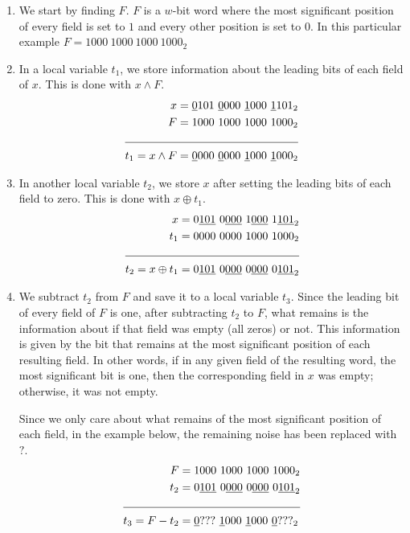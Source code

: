 \begin{enumerate}
    \item \label{blt:msb1}
    We start by finding $F$. $F$ is a $w$-bit word where the most significant position of every field is set to $1$ and every other position is set to $0$. In this particular example $F = 1000\ 1000\ 1000\ 1000_2$
    
    \item \label{blt:msb2}
    In a local variable $t_1$, we store information about the leading bits of each field of $x$. This is done with $x \wedge F$.
    \begin{align*}
                       x &= \underline{0}101\ \underline{0}000\ \underline{1}000\ \underline{1}101_2 \\
                       F &= 1000\ 1000\ 1000\ 1000_2 \\ \cline{1-2} 
        t_1 = x \wedge F &= \underline{0}000\ \underline{0}000\ \underline{1}000\ \underline{1}000_2
    \end{align*}
    
    \item \label{blt:msb3}
    In another local variable $t_2$, we store $x$ after setting the leading bits of each field to zero. This is done with $x \oplus t_1$.
    \begin{align*}
                         x &= 0\underline{101}\ 0\underline{000}\ 1\underline{000}\ 1\underline{101}_2 \\
                       t_1 &= 0000\ 0000\ 1000\ 1000_2 \\ \cline{1-2}
        t_2 = x \oplus t_1 &= 0\underline{101}\ 0\underline{000}\ 0\underline{000}\ 0\underline{101}_2
    \end{align*}
    
    \item \label{blt:msb4}
    We subtract $t_2$ from $F$ and save it to a local variable $t_3$. Since the leading bit of every field of $F$ is one, after subtracting $t_2$ to $F$, what remains is the information about if that field was empty (all zeros) or not. This information is given by the bit that remains at the most significant position of each resulting field. In other words, if in any given field of the resulting word, the most significant bit is one, then the corresponding field in $x$ was empty; otherwise, it was not empty.
    
    Since we only care about what remains of the most significant position of each field, in the example below, the remaining noise has been replaced with $?$.
    \begin{align*}
                    F &= 1000\ 1000\ 1000\ 1000_2 \\
                  t_2 &= 0\underline{101}\ 0\underline{000}\ 0\underline{000}\ 0\underline{101}_2 \\ \cline{1-2} 
        t_3 = F - t_2 &= \underline{0}???\ \underline{1}000\ \underline{1}000\ \underline{0}???_2
    \end{align*}
    

\end{enumerate}
